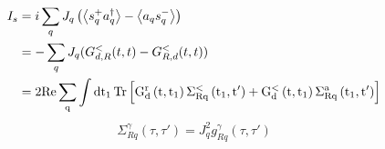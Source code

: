 \documentclass[aps,prb,onecolumn,amssymb,amsmath,superscriptaddress]{revtex4-1}
\begin{document}
\begin{equation}
\begin{split}
I_{s}&= i \sum_{q} J_{q}\left(\left\langle s_{q}^{+} a_{q}^{\dagger}\right\rangle-\left\langle a_{q} s_{q}^{-}\right\rangle\right) \\
&=-\sum_{q}J_{q}(G_{d,R}^{<}(t,t)-G_{R,d}^{<}(t,t)) \\
&=2\rm{Re}\sum_{q} \int  d t_{1}\operatorname{Tr}\left[G_{d}^{r}\left(t, t_{1}\right) \Sigma_{Rq}^{<}\left(t_{1}, t^{\prime}\right)+G_{d}^{<}\left(t, t_{1}\right) \Sigma_{Rq}^{a}\left(t_{1}, t^{\prime}\right)\right]
\end{split}
\end{equation}
\begin{equation}
\Sigma_{Rq}^{\gamma}(\tau, \tau')=J_{q}^{2}g_{Rq}^{\gamma}(\tau, \tau')
\end{equation}
\end{document}
